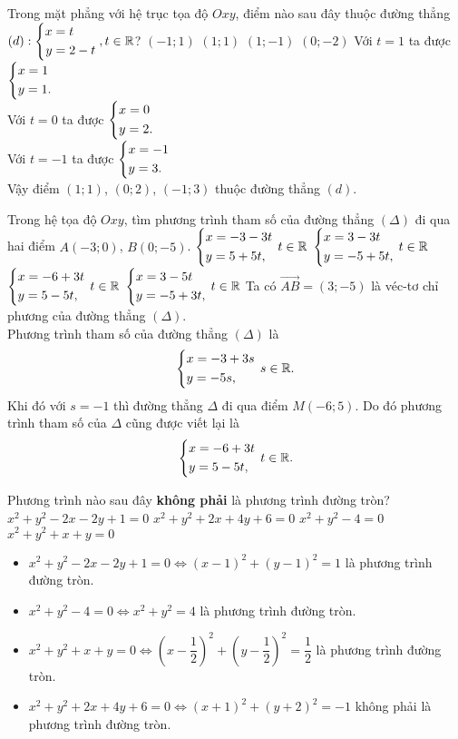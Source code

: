 \begin{ex}%
 Trong mặt phẳng với hệ trục tọa độ $Oxy$, điểm nào sau đây thuộc đường thẳng $(d): \left\{\begin{aligned} x & = t \\ y & = 2 -t\end{aligned}\right., t \in \mathbb{R}$?
 \choice
  {$(-1;1)$}
  {\True $(1;1)$}
  {$(1;-1)$}
  {$(0;-2)$}
 \loigiai
 {
 Với $t = 1$ ta được $\left\{\begin{aligned}& x = 1 \\& y = 1.\end{aligned}\right.$\\
 Với $t = 0$ ta được $\left\{\begin{aligned}& x = 0 \\& y = 2.\end{aligned}\right.$\\
 Với $t = -1$ ta được $\left\{\begin{aligned}& x = -1 \\& y = 3.\end{aligned}\right.$\\
 Vậy điểm $(1;1)$, $(0;2)$, $(-1;3)$ thuộc đường thẳng $(d)$.
 }
\end{ex}


\begin{ex}%
 Trong hệ tọa độ $Oxy$, tìm phương trình tham số của đường thẳng $(\Delta)$ đi qua hai điểm $A(-3;0)$, $B(0;-5)$.
 \choice
  {$\left\{\begin{aligned}& x=-3-3t \\& y=5+5t,\end{aligned}\right.\, t \in \mathbb{R}$}
  {$\left\{\begin{aligned}& x=3-3t \\& y=-5+5t,\end{aligned}\right.\, t \in \mathbb{R}$}
  {\True $\left\{\begin{aligned}& x=-6+3t \\& y=5-5t,\end{aligned}\right.\, t \in \mathbb{R}$}
  {$\left\{\begin{aligned}& x=3-5t \\& y=-5+3t,\end{aligned}\right.\, t \in \mathbb{R}$}
 \loigiai
 {
 Ta có $\vec{AB} = (3; -5)$ là véc-tơ chỉ phương của đường thẳng $(\Delta)$.\\
 Phương trình tham số của đường thẳng $(\Delta)$ là
 $$\left\{\begin{aligned}& x = -3 + 3s \\& y = -5s,\end{aligned}\right. \, s \in \mathbb{R}.$$
 Khi đó với $s = -1$ thì đường thẳng $\Delta$ đi qua điểm $M(-6;5)$. Do đó phương trình tham số của $\Delta$ cũng được viết lại là
 $$\left\{\begin{aligned}& x = -6 + 3t \\& y = 5 - 5t,\end{aligned}\right. \, t \in \mathbb{R}.$$
 }
\end{ex}


\begin{ex}%
 Phương trình nào sau đây \textbf{không phải} là phương trình đường tròn?
 \choice
  {$x^2 + y^2 - 2x - 2y + 1 = 0$}
  {\True $x^2 + y^2 + 2x + 4y + 6 = 0$}
  {$x^2 + y^2 - 4 = 0$}
  {$x^2 + y^2 + x + y = 0$}
 \loigiai
 {
 \begin{itemize}
  \item $x^2 + y^2 - 2x - 2y + 1 = 0 \Leftrightarrow (x - 1)^2 + (y - 1)^2 = 1$ là phương trình đường tròn.
  \item $x^2 + y^2 - 4 = 0 \Leftrightarrow x^2 + y^2 = 4$ là phương trình đường tròn.
  \item $x^2 + y^2 + x + y = 0 \Leftrightarrow \left( x - \dfrac{1}{2} \right)^2 + \left( y - \dfrac{1}{2} \right)^2 = \dfrac{1}{2}$ là phương trình đường tròn.
  \item $x^2 + y^2 + 2x + 4y + 6 = 0 \Leftrightarrow (x + 1)^2 + (y + 2)^2 = -1$ không phải là phương trình đường tròn.
 \end{itemize}
 }
\end{ex}


